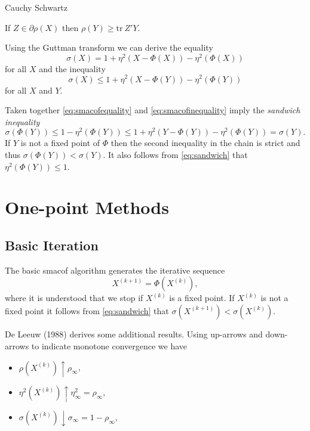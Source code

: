 \documentclass[
  12pt,
]{article}
\providecommand{\tightlist}{%
  \setlength{\itemsep}{0pt}\setlength{\parskip}{0pt}}
\begin{document}
Cauchy Schwartz

If \(Z\in\partial\rho(X)\) then \(\rho(Y)\geq\text{tr}\ Z'Y\).

Using the Guttman transform we can derive the equality
\begin{equation}
\sigma(X)=1+\eta^2(X-\Phi(X))-\eta^2(\Phi(X))
\label{eq:smacofequality}
\end{equation}
for all \(X\) and the inequality
\begin{equation}
\sigma(X)\leq 1+\eta^2(X-\Phi(Y))-\eta^2(\Phi(Y))
\label{eq:smacofinequality}
\end{equation}
for all \(X\) and \(Y\).

Taken together \eqref{eq:smacofequality} and \eqref{eq:smacofinequality} imply the \emph{sandwich inequality}
\begin{equation}
\sigma(\Phi(Y))\leq 1-\eta^2(\Phi(Y))\leq 1+\eta^2(Y-\Phi(Y))-\eta^2(\Phi(Y))=\sigma(Y).
\label{eq:sandwich}
\end{equation}
If \(Y\) is not a fixed point of \(\Phi\) then the second inequality in the
chain is strict and thus \(\sigma(\Phi(Y))<\sigma(Y)\). It also follows
from \eqref{eq:sandwich} that \(\eta^2(\Phi(Y))\leq 1\).

\section{One-point Methods}\label{one-point-methods}

\subsection{Basic Iteration}\label{basic-iteration}

The basic smacof algorithm generates the iterative sequence
\[
X^{(k+1)}=\Phi(X^{(k)}),
\]
where it is understood that we stop if \(X^{(k)}\) is a fixed point. If
\(X^{(k)}\) is not a fixed point it follows from \eqref{eq:sandwich} that \(\sigma(X^{(k+1)})<\sigma(X^{(k)})\).

De Leeuw (1988) derives some additional results. Using up-arrows and down-arrows
to indicate monotone convergence we have

\begin{itemize}
\tightlist
\item
  \(\rho(X^{(k)})\uparrow\rho_\infty\),
\item
  \(\eta^2(X^{(k)})\uparrow\eta^2_\infty=\rho_\infty\),
\item
  \(\sigma(X^{(k)})\downarrow\sigma_\infty=1-\rho_\infty\),
\end{itemize}
\end{document}
